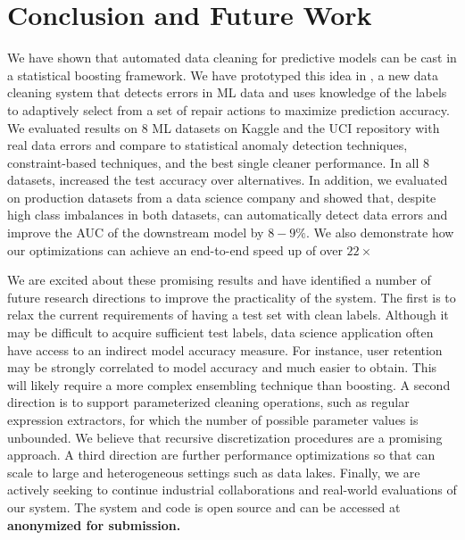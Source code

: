 \section{Conclusion and Future Work}
We have shown that automated data cleaning for predictive models can be cast in a statistical boosting framework.  We have prototyped this idea in \sys, a new data cleaning system that detects errors in ML data and uses knowledge of the labels to adaptively select from a set of repair actions to maximize prediction accuracy.
We evaluated results on 8 ML datasets on Kaggle and the UCI repository with real data errors and compare to statistical anomaly detection techniques, constraint-based techniques, and the best single cleaner performance. In all 8 datasets, \sys increased the  test accuracy over alternatives. In addition, we evaluated \sys on production datasets from a data science company and showed that, despite high class imbalances in both datasets, \sys can automatically detect data errors and improve the AUC of the downstream model by $8-9\%$.  We also demonstrate how our optimizations can achieve an end-to-end speed up of over $22\times$


We are excited about these promising results and have identified a number of future research directions to improve the practicality of the system.  The first is to relax the current requirements of having a test set with clean labels.   Although it may be difficult to acquire sufficient test labels, data science application often have access to an indirect model accuracy measure.  For instance, user retention may be strongly correlated to model accuracy and much easier to obtain.  This will likely require a more complex ensembling technique than boosting.  A second direction is to support parameterized cleaning operations, such as regular expression extractors, for which the number of possible parameter values is unbounded.  We believe that recursive discretization procedures are a promising approach.  A third direction are further performance optimizations so that \sys can scale to large and heterogeneous settings such as data lakes.  Finally, we are actively seeking to continue industrial collaborations and real-world evaluations of our system.  The system and code is open source and can be accessed at {\bf anonymized for submission.}
